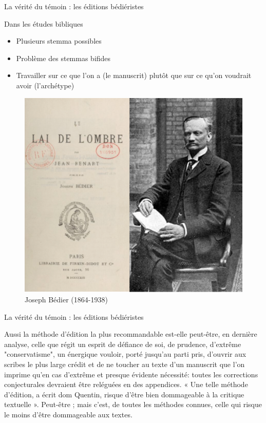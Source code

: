 \documentclass[11pt]{beamer}
\begin{document}
\begin{frame}{La vérité du témoin : les éditions bédiéristes}
\begin{minipage}{.45\textwidth}
\begin{block}{Dans les études bibliques}
\begin{itemize}
        \item Plusieurs stemma possibles
        \item Problème des stemmas bifides
        \item Travailler sur ce que l'on a (le manuscrit) plutôt que sur ce qu'on voudrait avoir (l'archétype)
\end{itemize}
\end{block}
\end{minipage}
\hfill
\begin{minipage}{.5\textwidth}
    \begin{figure}
    \centering
    \includegraphics[width=1\linewidth]{img/bedier.png}
    \caption{Joseph Bédier (1864-1938)}
    \end{figure} 
\end{minipage}
\end{frame}


\begin{frame}{La vérité du témoin : les éditions bédiéristes}
\begin{exampleblock}{}
    Aussi la méthode d’édition la plus recommandable est-elle peut-être, en dernière analyse, celle que régit un esprit de défiance de soi, de prudence, d’extrême "conservatisme", un énergique vouloir, porté jusqu’au parti pris, d’ouvrir aux scribes le plus large crédit et de ne toucher au texte d’un manuscrit que l’on imprime qu’en cas d’extrême et presque évidente nécessité: toutes les corrections conjecturales devraient être reléguées en des appendices. « Une telle méthode d’édition, a écrit dom Quentin, risque d’être bien dommageable à la critique textuelle ». Peut-être ; mais c’est, de toutes les méthodes connues, celle qui risque le moins d’être dommageable aux textes.
\end{exampleblock}
\footnotesize{}
\end{frame}
\end{document}
